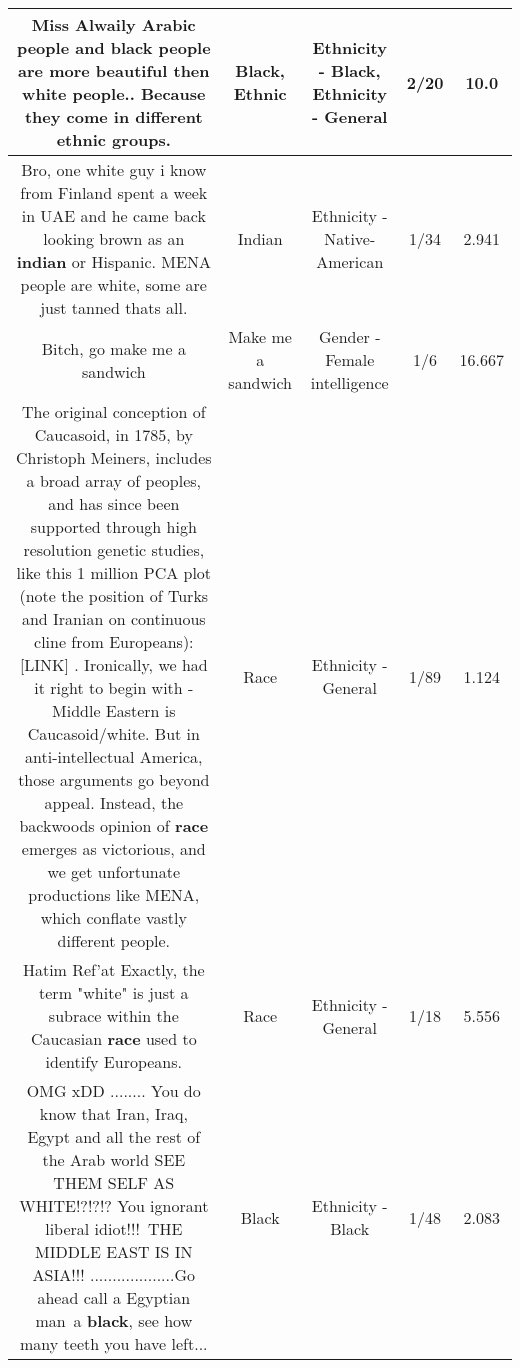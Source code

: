 \documentclass[11pt]{article}
\newlength\mylength
\begin{document}
\begin{center}
\begin{longtable}{|C{.65\mylength}|C{.30\mylength}|C{.12\mylength}|C{.12\mylength}|C{.12\mylength}|}
  \small Miss Alwaily Arabic people and \textbf{black} people are more beautiful then white people.. Because they come in  different \textbf{ethnic} groups.\normalsize   & Black, Ethnic & Ethnicity - Black, Ethnicity - General & 2/20 & 10.0 \\  \hline
  \small Bro, one white guy i know from Finland spent a week in UAE and he came back looking brown as an \textbf{indian} or Hispanic. MENA people are white, some are just tanned thats all.\normalsize   & Indian & Ethnicity - Native-American & 1/34 & 2.941 \\  \hline
  \small Bitch, go make me a sandwich\normalsize   & Make me a sandwich & Gender - Female intelligence & 1/6 & 16.667 \\  \hline
  \small The original conception of Caucasoid, in 1785, by Christoph Meiners, includes a broad array of peoples, and has since been supported through high resolution genetic studies, like this 1 million PCA plot (note the position of Turks and Iranian on continuous cline from Europeans):  [LINK]   .   Ironically, we had it right to begin with - Middle Eastern is Caucasoid/white.  But in anti-intellectual America, those arguments go beyond appeal.  Instead, the backwoods opinion of \textbf{race} emerges as victorious, and we get unfortunate productions like MENA, which conflate vastly different people.\normalsize   & Race & Ethnicity - General & 1/89 & 1.124 \\  \hline
  \small Hatim Ref'at Exactly, the term "white" is just a subrace within the Caucasian \textbf{race} used to identify Europeans.\normalsize   & Race & Ethnicity - General & 1/18 & 5.556 \\  \hline
  \small OMG xDD ........ You do know that Iran, Iraq, Egypt and all the rest of the Arab world SEE THEM SELF AS WHITE!?!?!? You ignorant liberal idiot!!! THE MIDDLE EAST IS IN ASIA!!! ...................Go ahead call a Egyptian man a \textbf{black}, see how many teeth you have left...\normalsize   & Black & Ethnicity - Black & 1/48 & 2.083 \\  \hline

\end{longtable}
\end{center}
\end{document}
